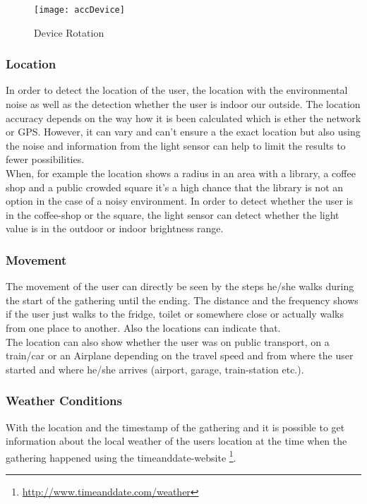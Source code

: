 {\begin{figure}[!htb]
\centering
\texttt{[image: accDevice]}
\caption{Device Rotation}\label{accDev}
\vspace{10 mm}
\end{figure}
\FloatBarrier

\subsubsection{Location}
In order to detect the location of the user, the location with the environmental noise as well as the detection whether the user is indoor our outside. The location accuracy depends on the way how it is been calculated which is ether the network or GPS. However, it can vary and can't ensure a the exact location but also using the noise and information from the light sensor can help to limit the results to fewer possibilities.\\
When, for example the location shows a radius in an area with a library, a coffee shop and a public crowded square it's a high chance that the library is not an option in the case of a noisy environment. In order to detect whether the user is in the coffee-shop or the square, the light sensor can detect whether the light value is in the outdoor or indoor brightness range. 

\subsubsection{Movement}
The movement of the user can directly be seen by the steps he/she walks during the start of the gathering until the ending. The distance and the frequency shows if the user just walks to the fridge, toilet or somewhere close or actually walks from one place to another. Also the locations can indicate that.\\
The location can also show whether the user was on public transport, on a train/car or an Airplane depending on the travel speed and from where the user started and where he/she arrives (airport, garage, train-station etc.). 

\subsubsection{Weather Conditions}
With the location and the timestamp of the gathering and it is possible to get information about the local weather of the users location at the time when the gathering happened using the timeanddate-website \footnote{\url{http://www.timeanddate.com/weather}}.


}
